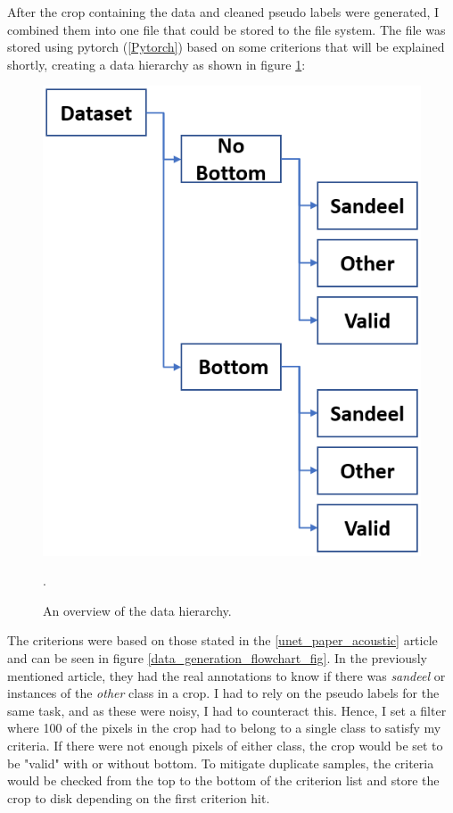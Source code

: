         After the crop containing the data and cleaned pseudo labels were generated, I combined them into one file that could be stored to the file system. The file was stored using pytorch (\ref{Pytorch}) based on some criterions that will be explained shortly, creating a data hierarchy as shown in figure \ref{data_hierarchy_fig}:
        
        
        \clearpage
        \begin{figure}[H]
            \centering
            \includegraphics[scale=0.5]{figures/data_hierarki.png}
            \caption[The data-hierarchy]{An overview of the data hierarchy.}.
          	\medskip 
            \label{data_hierarchy_fig}
        \end{figure}
        
        The criterions were based on those stated in the \ref{unet_paper_acoustic} article and can be seen in figure \ref{data_generation_flowchart_fig}. In the previously mentioned article, they had the real annotations to know if there was \textit{sandeel} or instances of the \textit{other} class in a crop. I had to rely on the pseudo labels for the same task, and as these were noisy, I had to counteract this. Hence, I set a filter where 100 of the pixels in the crop had to belong to a single class to satisfy my criteria. If there were not enough pixels of either class, the crop would be set to be "valid" with or without bottom. To mitigate duplicate samples, the criteria would be checked from the top to the bottom of the criterion list and store the crop to disk depending on the first criterion hit.
        
